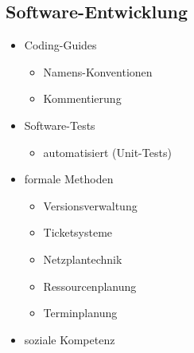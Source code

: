 \subsection{Software-Entwicklung}
\begin{itemize}
\item Coding-Guides
\begin{itemize}
\item Namens-Konventionen
\item Kommentierung
\end{itemize}
\item Software-Tests
\begin{itemize}
\item automatisiert (Unit-Tests)
\end{itemize}
\item formale Methoden
\begin{itemize}
\item Versionsverwaltung
\item Ticketsysteme
\item Netzplantechnik
\item Ressourcenplanung
\item Terminplanung
\end{itemize}
\item soziale Kompetenz
\end{itemize}
